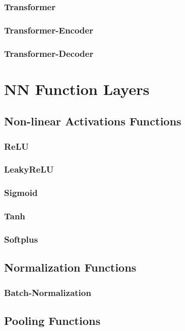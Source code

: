 \subsubsection{Transformer}
\subsubsection{Transformer-Encoder}
\subsubsection{Transformer-Decoder}


\section{NN Function Layers}
\subsection{Non-linear Activations Functions}
\subsubsection{ReLU}
\subsubsection{LeakyReLU}
\subsubsection{Sigmoid}
\subsubsection{Tanh}
\subsubsection{Softplus}

\subsection{Normalization Functions}
\subsubsection{Batch-Normalization}

\subsection{Pooling Functions}

